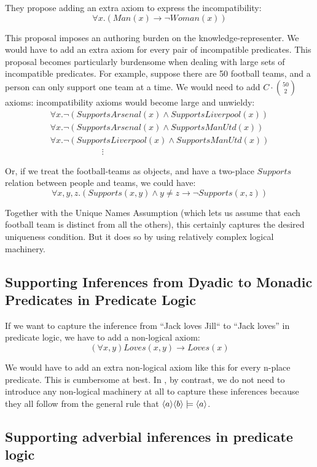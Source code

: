 \NI They propose adding an extra axiom to express the incompatibility:
\[
   \forall x. ( Man(x) \rightarrow \neg Woman(x) )
\]  
 
\NI This proposal imposes an authoring burden on the
knowledge-representer.  We would have to add an extra axiom for every
pair of incompatible predicates.  This proposal becomes particularly
burdensome when dealing with large sets of incompatible predicates.
For example, suppose there are 50 football teams, and a person can
only support one team at a time.  We would need to add $C \cdot {50 \choose 2}$
axioms: incompatibility axioms would become large and unwieldy:
\[
\begin{array}{l}
  \forall x.  \neg (SupportsArsenal(x) \land SupportsLiverpool(x))  \\
  \forall x.  \neg (SupportsArsenal(x) \land SupportsManUtd(x))  \\
  \forall x.  \neg (SupportsLiverpool(x) \land SupportsManUtd(x))  \\
  \qquad \qquad \qquad \vdots
\end{array}
\]

\NI Or, if we treat the football-teams as objects, and have a
two-place $Supports$ relation between people and teams, we could have:
\[
   \forall x, y, z. (Supports(x,y) \land y \neq z \rightarrow \neg Supports(x,z))
\]   

\NI Together with the Unique Names Assumption (which lets us assume
that each football team is distinct from all the others), this
certainly captures the desired uniqueness condition.  But it does so
by using relatively complex logical machinery.

\subsection{Supporting Inferences from Dyadic to Monadic Predicates in Predicate Logic}
If we want to capture the inference from ``Jack loves Jill`` to ``Jack loves'' in predicate logic, we have to add a non-logical axiom:
\[
(\forall x, y) Loves(x,y) \rightarrow Loves(x)
\]

\NI We would have to add an extra non-logical axiom like this for every
n-place predicate.  This is cumbersome at best.  In \ELABR{}, by
contrast, we do not need to introduce any non-logical machinery at all
to capture these inferences because they all follow from the general
rule that $\MAY{a} \MAY{b} \models \MAY{a}$.

\subsection{Supporting adverbial inferences in predicate logic}

